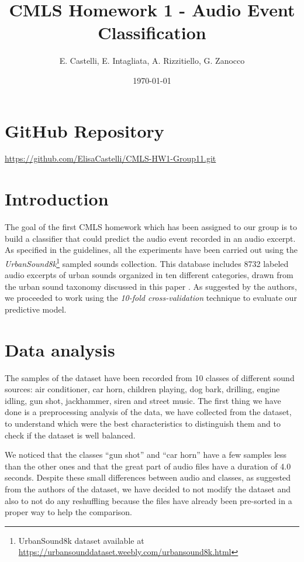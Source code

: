 \documentclass[letterpaper, 12pt]{article}
\begin{document}
	
	\title{CMLS Homework 1 - Audio Event Classification}
	\author{E. Castelli, E. Intagliata, A. Rizzitiello, G. Zanocco}
	\date{\today}
	\maketitle
	
	\section{GitHub Repository}
	\url{https://github.com/ElisaCastelli/CMLS-HW1-Group11.git}
	
	\section{Introduction}
	The goal of the first CMLS homework which has been assigned to our group is to build a classifier that could predict the audio event recorded in an audio excerpt. As specified in the guidelines, all the experiments have been carried out using the \textit{UrbanSound8k}\footnote{UrbanSound8k dataset available at \url{https://urbansounddataset.weebly.com/urbansound8k.html}} sampled sounds collection. This database includes 8732 labeled audio excerpts of urban sounds organized in ten different categories, drawn from the urban sound taxonomy discussed in this paper \cite{sal14}. As suggested by the authors, we proceeded to work using the \textit{10-fold cross-validation} technique to evaluate our predictive model.
	
	
	\section{Data analysis}
	The samples of the dataset have been recorded from 10 classes of different sound sources: air conditioner, car horn, children playing, dog bark, drilling, engine idling, gun shot, jackhammer, siren and street music. The first thing we have done is a preprocessing analysis of the data, we have collected from the dataset, to understand which were the best characteristics to distinguish them and to check if the dataset is well balanced.
	
	We noticed that the classes “gun shot” and “car horn” have a few samples less than the other ones and that the great part of audio files have a duration of 4.0 seconds. Despite these small differences between audio and classes, as suggested from the authors of the dataset, we have decided to not modify the dataset and also to not do any reshuffling because the files have already been pre-sorted in a proper way to help the comparison.
	
\end{document}
